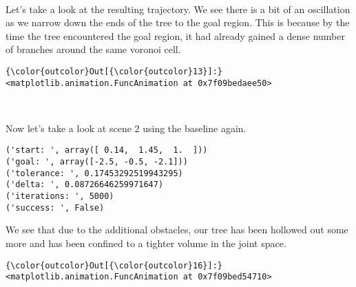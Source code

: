 \documentclass{article}
\begin{document}
    \begin{center}
    \end{center}
    { \hspace*{\fill} \\}
    
    Let's take a look at the resulting trajectory. We see there is a bit of
an oscillation as we narrow down the ends of the tree to the goal
region. This is because by the time the tree encountered the goal
region, it had already gained a dense number of branches around the same
voronoi cell.


            \begin{Verbatim}[commandchars=\\\{\}]
{\color{outcolor}Out[{\color{outcolor}13}]:} <matplotlib.animation.FuncAnimation at 0x7f09bedaee50>
\end{Verbatim}
        
    \begin{center}
    \end{center}
    { \hspace*{\fill} \\}
    
    Now let's take a look at scene 2 using the baseline again.


    \begin{Verbatim}[commandchars=\\\{\}]
('start: ', array([ 0.14,  1.45,  1.  ]))
('goal: ', array([-2.5, -0.5, -2.1]))
('tolerance: ', 0.17453292519943295)
('delta: ', 0.08726646259971647)
('iterations: ', 5000)
('success: ', False)
    \end{Verbatim}

    We see that due to the additional obstacles, our tree has been hollowed
out some more and has been confined to a tighter volume in the joint
space.



            \begin{Verbatim}[commandchars=\\\{\}]
{\color{outcolor}Out[{\color{outcolor}16}]:} <matplotlib.animation.FuncAnimation at 0x7f09bed54710>
\end{Verbatim}
        
    \begin{center}
    \end{center}
    { \hspace*{\fill} \\}
    
\end{document}
